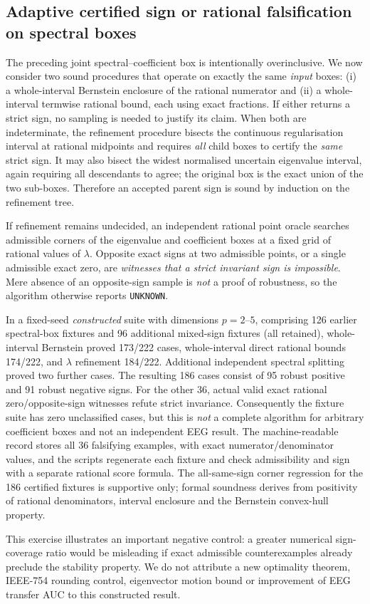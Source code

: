 \subsection{Adaptive certified sign or rational falsification on spectral boxes}
\label{sec:p4-rational-adaptive-counterexamples}
The preceding joint spectral--coefficient box is intentionally
overinclusive. We now consider two sound procedures that operate
on exactly the same \emph{input} boxes: (i) a whole-interval
Bernstein enclosure of the rational numerator and (ii) a
whole-interval termwise rational bound, each using exact fractions.
If either returns a strict sign, no sampling is needed to
justify its claim. When both are indeterminate, the refinement
procedure bisects the continuous regularisation interval at
rational midpoints and requires \emph{all} child boxes to certify
the \emph{same} strict sign. It may also bisect the widest
normalised uncertain eigenvalue interval, again requiring
all descendants to agree; the original box is the exact
union of the two sub-boxes. Therefore an accepted parent sign
is sound by induction on the refinement tree.

If refinement remains undecided, an independent rational
point oracle searches admissible corners of the eigenvalue
and coefficient boxes at a fixed grid of rational values of
$\lambda$. Opposite exact signs at two admissible points,
or a single admissible exact zero, are \emph{witnesses that a
strict invariant sign is impossible}. Mere absence of an
opposite-sign sample is \emph{not} a proof of robustness,
so the algorithm otherwise reports \texttt{UNKNOWN}.

In a fixed-seed \emph{constructed} suite with dimensions
$p=2$--$5$, comprising 126 earlier spectral-box fixtures
and 96 additional mixed-sign fixtures (all retained),
whole-interval Bernstein proved 173/222 cases, whole-interval
direct rational bounds 174/222, and $\lambda$ refinement
184/222. Additional independent spectral splitting proved
two further cases. The resulting 186 cases consist of
95 robust positive and 91 robust negative signs.
For the other 36, actual valid exact rational zero/opposite-sign
witnesses refute strict invariance. Consequently the fixture
suite has zero unclassified cases, but this is
\emph{not} a complete algorithm for arbitrary coefficient
boxes and not an independent EEG result.
The machine-readable record stores all 36 falsifying
examples, with exact numerator/denominator values, and
the scripts regenerate each fixture and check admissibility
and sign with a separate rational score formula.
The all-same-sign corner regression for the 186 certified
fixtures is supportive only; formal soundness derives from
positivity of rational denominators, interval enclosure and
the Bernstein convex-hull property.

This exercise illustrates an important negative control:
a greater numerical sign-coverage ratio would be misleading
if exact admissible counterexamples already preclude the
stability property. We do not attribute a new optimality theorem,
IEEE-754 rounding control, eigenvector motion bound or
improvement of EEG transfer AUC to this constructed result.
